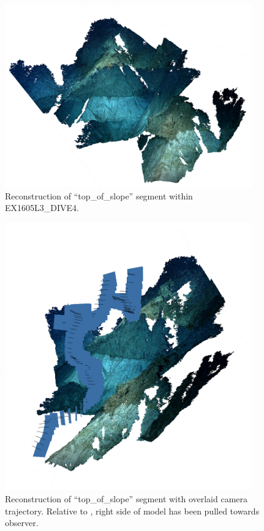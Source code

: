 \documentclass[letterpaper,12pt]{article}
\begin{document}
\begin{figure}
    \centering
    \includegraphics[width=0.95\textwidth]{images/top_of_slope_reconstruction.png}
    \caption{Reconstruction of ``top\_of\_slope'' segment within EX1605L3\_DIVE4.}
    \label{fig:top_of_slope_reconstruction}
\end{figure}

\begin{figure}
    \centering
    \includegraphics[width=0.95\textwidth]{images/top_of_slope_reconstruction_trajectory.png}
    \caption{Reconstruction of ``top\_of\_slope'' segment with overlaid camera trajectory.  Relative to \label{fig:top_of_slope_reconstruction}, right side of model has been pulled towards observer.}
    \label{fig:top_of_slope_reconstruction_trajectory}
\end{figure}
\end{document}
